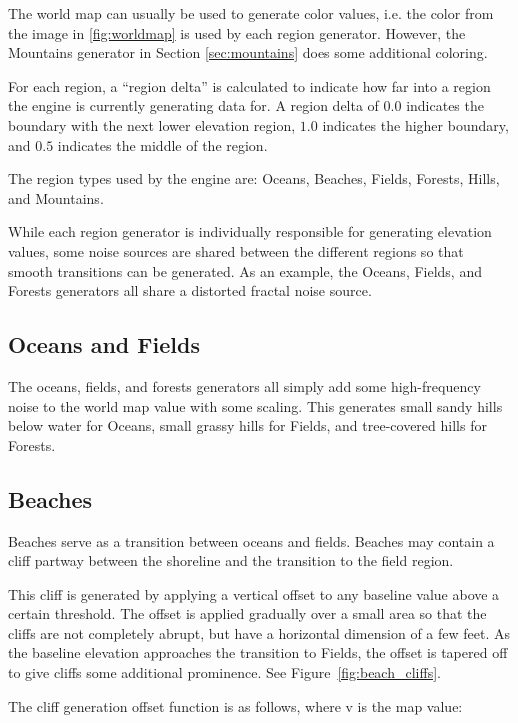 The world map can usually be used to generate color values, i.e. the color from the image in \ref{fig:worldmap} is used by each region generator.
However, the Mountains generator in Section \ref{sec:mountains} does some additional coloring.

For each region, a ``region delta'' is calculated to indicate how far into a region the engine is currently generating data for.
A region delta of \(0.0\) indicates the boundary with the next lower elevation region, \(1.0\) indicates the higher boundary, and \(0.5\) indicates the middle of the region.

The region types used by the engine are: Oceans, Beaches, Fields, Forests, Hills, and Mountains.

While each region generator is individually responsible for generating elevation values, some noise sources are shared between the different regions so that smooth transitions can be generated.
As an example, the Oceans, Fields, and Forests generators all share a distorted fractal noise source.

\subsection{Oceans and Fields}

The oceans, fields, and forests generators all simply add some high-frequency noise to the world map value with some scaling.
This generates small sandy hills below water for Oceans, small grassy hills for Fields, and tree-covered hills for Forests.

\subsection{Beaches}

Beaches serve as a transition between oceans and fields.
Beaches may contain a cliff partway between the shoreline and the transition to the field region.

This cliff is generated by applying a vertical offset to any baseline value above a certain threshold.
The offset is applied gradually over a small area so that the cliffs are not completely abrupt, but have a horizontal dimension of a few feet.
As the baseline elevation approaches the transition to Fields, the offset is tapered off to give cliffs some additional prominence.
See Figure~\ref{fig:beach_cliffs}.

The cliff generation offset function is as follows, where v is the map value:

